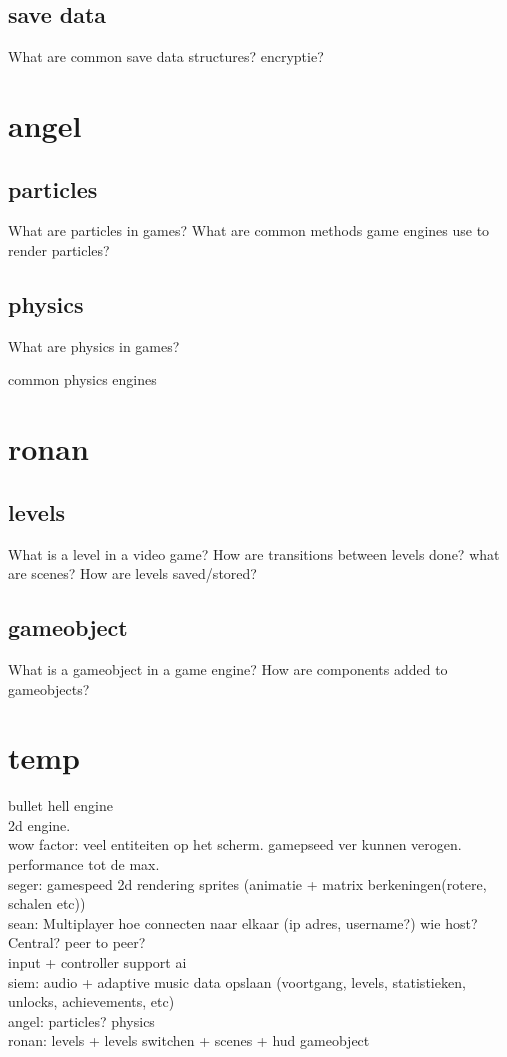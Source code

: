 \documentclass{article} %
\begin{document}
    \subsection{save data}
    What are common save data structures?
    encryptie?
\newpage

\section{angel}
    \subsection{particles}
    What are particles in games?
    What are common methods game engines use to render particles?
    \subsection{physics}
    What are physics in games?

    common physics engines
    
\newpage

\section{ronan}
    \subsection{levels}
    What is a level in a video game?
    How are transitions between levels done?
    what are scenes?
    How are levels saved/stored?
    \subsection{gameobject}
    What is a gameobject in a game engine?
    How are components added to gameobjects?

\newpage

\section{temp}
    bullet hell engine
    \\
    2d engine.
    \\
    wow factor: veel entiteiten op het scherm. gamepseed ver kunnen verogen.
    performance tot de max.
\\
    seger:
    gamespeed                                   
    2d rendering 
    sprites (animatie + matrix berkeningen(rotere, schalen etc)) 
    \\
    sean:
    Multiplayer
    hoe connecten naar elkaar (ip adres, username?)
    wie host? Central? peer to peer?
    \\
    input + controller support
    ai
    \\
    siem:
    audio + adaptive music 
    data opslaan (voortgang, levels, statistieken, unlocks, achievements, etc)
    \\
    angel:
    particles?
    physics
    \\
    ronan:
    levels + levels switchen + scenes + hud
    gameobject
    
    
\newpage
\end{document}
